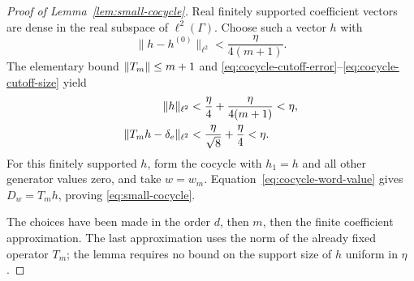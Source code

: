 \begin{proof}[Proof of Lemma~\ref{lem:small-cocycle}]
Real finitely supported coefficient vectors are dense in the
real subspace of $\ell^2(\Gamma)$.
Choose such a vector $h$ with
\[
  \|h-h^{(0)}\|_{\ell^2}
       <\frac{\eta}{4(m+1)}.
\]
The elementary bound $\left\lVert T_m\right\rVert\leq m+1$ and
\eqref{eq:cocycle-cutoff-error}--\eqref{eq:cocycle-cutoff-size}
yield
\begin{align*}
  \|h\|_{\ell^2}
    &<\frac{\eta}{4}+\frac{\eta}{4(m+1)}<\eta,\\
  \|T_mh-\delta_e\|_{\ell^2}
    &<\frac{\eta}{\sqrt{8}}+\frac{\eta}{4}<\eta.
\end{align*}
For this finitely supported $h$, form the cocycle with
$h_1=h$ and all other generator values zero, and take $w=w_m$.
Equation~\eqref{eq:cocycle-word-value} gives $D_w=T_mh$, proving
\eqref{eq:small-cocycle}.

The choices have been made in the order $d$, then $m$, then the
finite coefficient approximation.  The last approximation uses
the norm of the already fixed operator $T_m$; the lemma requires
no bound on the support size of $h$ uniform in $\eta$.
\end{proof}

